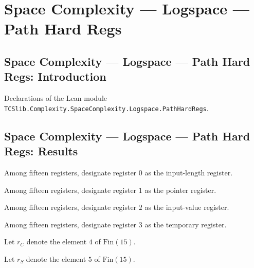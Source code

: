 \section{Space Complexity --- Logspace --- Path Hard Regs}
\subsection*{Space Complexity --- Logspace --- Path Hard Regs: Introduction}

Declarations of the Lean module \texttt{TCSlib.Complexity.SpaceComplexity.Logspace.PathHardRegs}.

\subsection*{Space Complexity --- Logspace --- Path Hard Regs: Results}

\begin{definition}
\label{Complexity.PathHard.rY}
\leanok
Among fifteen registers, designate register $0$ as the input-length register.
\end{definition}

\begin{definition}
\label{Complexity.PathHard.rP}
\leanok
Among fifteen registers, designate register $1$ as the pointer register.
\end{definition}

\begin{definition}
\label{Complexity.PathHard.rX}
\leanok
Among fifteen registers, designate register $2$ as the input-value register.
\end{definition}

\begin{definition}
\label{Complexity.PathHard.rT}
\leanok
Among fifteen registers, designate register $3$ as the temporary register.
\end{definition}

\begin{definition}[Index c]
\label{Complexity.PathHard.rC}
\leanok
Let $r_C$ denote the element $4$ of $\mathrm{Fin}(15)$.
\end{definition}

\begin{definition}[Index s]
\label{Complexity.PathHard.rS}
\leanok
Let $r_S$ denote the element $5$ of $\mathrm{Fin}(15)$.
\end{definition}

